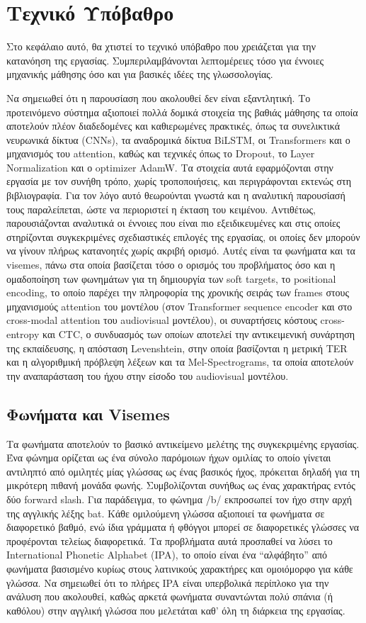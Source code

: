 \section{Τεχνικό Υπόβαθρο}
\label{Background}

Στο κεφάλαιο αυτό, θα χτιστεί το τεχνικό υπόβαθρο που χρειάζεται για την κατανόηση της εργασίας. Συμπεριλαμβάνονται λεπτομέρειες τόσο για έννοιες μηχανικής μάθησης όσο και για βασικές ιδέες της γλωσσολογίας.

Να σημειωθεί ότι η παρουσίαση που ακολουθεί δεν είναι εξαντλητική. Το προτεινόμενο σύστημα αξιοποιεί πολλά δομικά στοιχεία της βαθιάς μάθησης τα οποία αποτελούν πλέον διαδεδομένες και καθιερωμένες πρακτικές, όπως τα συνελικτικά νευρωνικά δίκτυα (CNNs), τα αναδρομικά δίκτυα BiLSTM, οι Transformers και ο μηχανισμός του attention, καθώς και τεχνικές όπως το Dropout, το Layer Normalization και ο optimizer AdamW. Τα στοιχεία αυτά εφαρμόζονται στην εργασία με τον συνήθη τρόπο, χωρίς τροποποιήσεις, και περιγράφονται εκτενώς στη βιβλιογραφία. Για τον λόγο αυτό θεωρούνται γνωστά και η αναλυτική παρουσίασή τους παραλείπεται, ώστε να περιοριστεί η έκταση του κειμένου. Αντιθέτως, παρουσιάζονται αναλυτικά οι έννοιες που είναι πιο εξειδικευμένες και στις οποίες στηρίζονται συγκεκριμένες σχεδιαστικές επιλογές της εργασίας, οι οποίες δεν μπορούν να γίνουν πλήρως κατανοητές χωρίς ακριβή ορισμό. Αυτές είναι τα φωνήματα και τα visemes, πάνω στα οποία βασίζεται τόσο ο ορισμός του προβλήματος όσο και η ομαδοποίηση των φωνημάτων για τη δημιουργία των soft targets, το positional encoding, το οποίο παρέχει την πληροφορία της χρονικής σειράς των frames στους μηχανισμούς attention του μοντέλου (στον Transformer sequence encoder και στο cross-modal attention του audiovisual μοντέλου), οι συναρτήσεις κόστους cross-entropy και CTC, ο συνδυασμός των οποίων αποτελεί την αντικειμενική συνάρτηση της εκπαίδευσης, η απόσταση Levenshtein, στην οποία βασίζονται η μετρική TER και η αλγοριθμική πρόβλεψη λέξεων και τα Mel-Spectrograms, τα οποία αποτελούν την αναπαράσταση του ήχου στην είσοδο του audiovisual μοντέλου.

\subsection{Φωνήματα και Visemes}
\label{Phonemes}
Τα φωνήματα αποτελούν το βασικό αντικείμενο μελέτης της συγκεκριμένης εργασίας. Ένα φώνημα ορίζεται ως ένα σύνολο παρόμοιων ήχων ομιλίας το οποίο γίνεται αντιληπτό από ομιλητές μίας γλώσσας ως ένας βασικός ήχος, πρόκειται δηλαδή για τη μικρότερη πιθανή μονάδα φωνής. Συμβολίζονται συνήθως ως ένας χαρακτήρας εντός δύο forward slash. Για παράδειγμα, το φώνημα /b/ εκπροσωπεί τον ήχο στην αρχή της αγγλικής λέξης bat. Κάθε ομιλούμενη γλώσσα αξιοποιεί τα φωνήματα σε διαφορετικό βαθμό, ενώ ίδια γράμματα ή φθόγγοι μπορεί σε διαφορετικές γλώσσες να προφέρονται τελείως διαφορετικά. Τα προβλήματα αυτά προσπαθεί να λύσει το International Phonetic Alphabet (IPA), το οποίο είναι ένα ``αλφάβητο'' από φωνήματα βασισμένο κυρίως στους λατινικούς χαρακτήρες και ομοιόμορφο για κάθε γλώσσα. Να σημειωθεί ότι το πλήρες IPA είναι υπερβολικά περίπλοκο για την ανάλυση που ακολουθεί, καθώς αρκετά φωνήματα συναντώνται πολύ σπάνια (ή καθόλου) στην αγγλική γλώσσα που μελετάται καθ' όλη τη διάρκεια της εργασίας.

